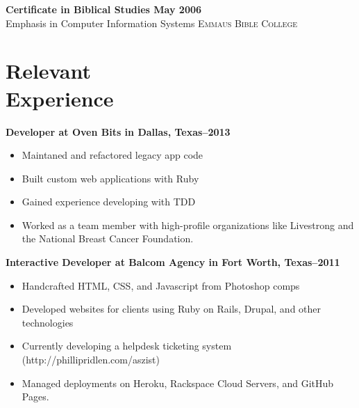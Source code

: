 \documentclass[margin]{res}
\newcommand{\sectionspace}{\vspace{10pt}}
\begin{document}
\begin{resume}
                \textbf{Certificate in Biblical Studies \dotfill May 2006 }  \\
                Emphasis in Computer Information Systems \hfill \textsc{Emmaus Bible College}

\sectionspace


\section{
Relevant \\ Experience}

              
                \textbf{Developer
                 at Oven Bits in Dallas, Texas--2013}
                 \vspace{-10pt}\begin{itemize} \itemsep -2pt %
                   \item Maintaned and refactored legacy app code
                 
                   \item Built custom web applications with Ruby
                 
                   \item Gained experience developing with TDD
                 
                   \item Worked as a team member with high-profile organizations like Livestrong and the National Breast Cancer Foundation.
                 \end{itemize}
              
                \textbf{Interactive Developer
                 at Balcom Agency in Fort Worth, Texas--2011}
                 \vspace{-10pt}\begin{itemize} \itemsep -2pt %
                   \item Handcrafted HTML, CSS, and Javascript from Photoshop comps
                 
                   \item Developed websites for clients using Ruby on Rails, Drupal, and other technologies
                 
                   \item Currently developing a helpdesk ticketing system (http://phillipridlen.com/aszist)
                 
                   \item Managed deployments on Heroku, Rackspace Cloud Servers, and GitHub Pages.
                 \end{itemize}
              

\end{resume}
\end{document}
